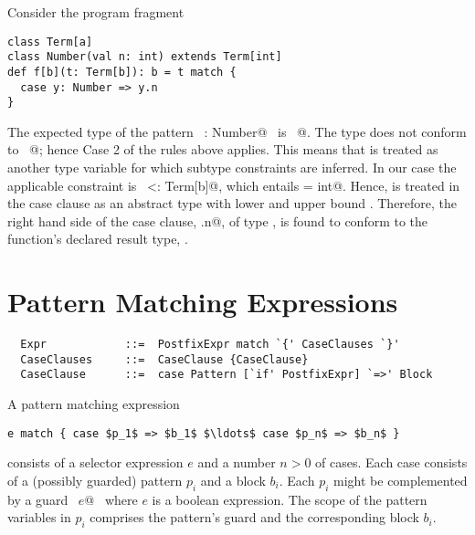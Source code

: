 \example
Consider the program fragment
\begin{lstlisting}
class Term[a]
class Number(val n: int) extends Term[int]
def f[b](t: Term[b]): b = t match {
  case y: Number => y.n
}
\end{lstlisting}
The expected type of the pattern ~\lstinline@y: Number@~ is
~\lstinline@Term[b]@.  The type  does not conform to
~\lstinline@Term[b]@; hence Case 2 of the rules above
applies. This means that \lstinline@b@ is treated as another type
variable for which subtype constraints are inferred. In our case the
applicable constraint is ~\lstinline@Number <: Term[b]@, which
entails \lstinline@b = int@.  Hence, \lstinline@b@ is treated in
the case clause as an abstract type with lower and upper bound
\lstinline@int@. Therefore, the right hand side of the case clause,
\lstinline@y.n@, of type \lstinline@int@, is found to conform to the
function's declared result type, \lstinline@Number@.

\section{Pattern Matching Expressions}
\label{sec:pattern-match}

\syntax\begin{lstlisting}
  Expr            ::=  PostfixExpr match `{' CaseClauses `}'
  CaseClauses     ::=  CaseClause {CaseClause}
  CaseClause      ::=  case Pattern [`if' PostfixExpr] `=>' Block
\end{lstlisting}

A pattern matching expression
\begin{lstlisting}
e match { case $p_1$ => $b_1$ $\ldots$ case $p_n$ => $b_n$ }
\end{lstlisting}
consists of a selector expression $e$ and a number $n > 0$ of
cases. Each case consists of a (possibly guarded) pattern $p_i$ and a
block $b_i$. Each $p_i$ might be complemented by a guard
~\lstinline@if $e$@~ where $e$ is a boolean expression. 
The scope of the pattern
variables in $p_i$ comprises the pattern's guard and the corresponding block $b_i$.

